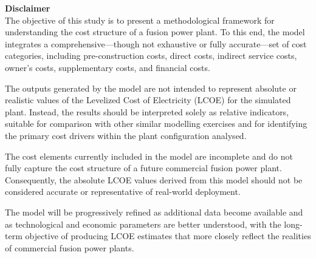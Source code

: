 \textbf{Disclaimer} \\

The objective of this study is to present a methodological framework for understanding the cost structure of a fusion power plant. To this end, the model integrates a comprehensive—though not exhaustive or fully accurate—set of cost categories, including pre-construction costs, direct costs, indirect service costs, owner's costs, supplementary costs, and financial costs.

The outputs generated by the model are not intended to represent absolute or realistic values of the Levelized Cost of Electricity (LCOE) for the simulated plant. Instead, the results should be interpreted solely as relative indicators, suitable for comparison with other similar modelling exercises and for identifying the primary cost drivers within the plant configuration analysed.

The cost elements currently included in the model are incomplete and do not fully capture the cost structure of a future commercial fusion power plant. Consequently, the absolute LCOE values derived from this model should not be considered accurate or representative of real-world deployment.

The model will be progressively refined as additional data become available and as technological and economic parameters are better understood, with the long-term objective of producing LCOE estimates that more closely reflect the realities of commercial fusion power plants.\\
\newpage